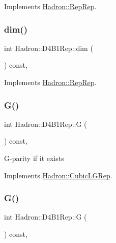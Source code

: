 Implements \mbox{\hyperlink{structHadron_1_1RepRep_a92c8802e5ed7afd7da43ccfd5b7cd92b}{Hadron\+::\+Rep\+Rep}}.

\mbox{\label{structHadron_1_1D4B1Rep_adac801c8769811e585d8c984477629ae}} 
\subsubsection{\texorpdfstring{dim()}{dim()}\hspace{0.1cm}{\footnotesize\ttfamily [3/3]}}
{\footnotesize\ttfamily int Hadron\+::\+D4\+B1\+Rep\+::dim (\begin{DoxyParamCaption}{ }\end{DoxyParamCaption}) const\hspace{0.3cm}{\ttfamily [inline]}, {\ttfamily [virtual]}}



Implements \mbox{\hyperlink{structHadron_1_1RepRep_a92c8802e5ed7afd7da43ccfd5b7cd92b}{Hadron\+::\+Rep\+Rep}}.

\mbox{\label{structHadron_1_1D4B1Rep_aac5f086b96bd21a570788d9ffb92dbca}} 
\subsubsection{\texorpdfstring{G()}{G()}\hspace{0.1cm}{\footnotesize\ttfamily [1/2]}}
{\footnotesize\ttfamily int Hadron\+::\+D4\+B1\+Rep\+::G (\begin{DoxyParamCaption}{ }\end{DoxyParamCaption}) const\hspace{0.3cm}{\ttfamily [inline]}, {\ttfamily [virtual]}}

G-\/parity if it exists 

Implements \mbox{\hyperlink{structHadron_1_1CubicLGRep_ace26f7b2d55e3a668a14cb9026da5231}{Hadron\+::\+Cubic\+L\+G\+Rep}}.

\mbox{\label{structHadron_1_1D4B1Rep_aac5f086b96bd21a570788d9ffb92dbca}} 
\subsubsection{\texorpdfstring{G()}{G()}\hspace{0.1cm}{\footnotesize\ttfamily [2/2]}}
{\footnotesize\ttfamily int Hadron\+::\+D4\+B1\+Rep\+::G (\begin{DoxyParamCaption}{ }\end{DoxyParamCaption}) const\hspace{0.3cm}{\ttfamily [inline]}, {\ttfamily [virtual]}}

